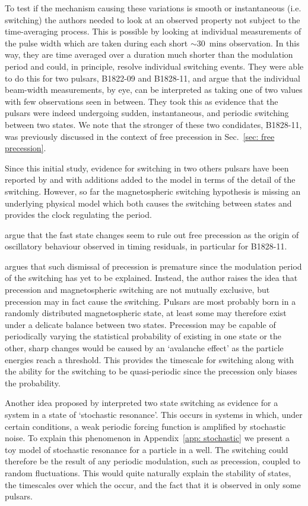 To test if the mechanism causing these variations is smooth or instantaneous
(i.e. switching) the authors needed to look at an observed property not subject
to the time-averaging process.  This is possible by looking at individual
measurements of the pulse width which are taken during each short $\sim30$~mins
observation. In this way, they are time averaged over a duration much shorter
than the modulation period and could, in principle, resolve individual
switching events. They were able to do this for two pulsars, B1822-09 and
B1828-11, and argue that the individual beam-width measurements, by eye, can be
interpreted as taking one of two values with few observations seen in between.
They took this as evidence that the pulsars were indeed undergoing sudden,
instantaneous, and periodic switching between two states. We note that the
stronger of these two condidates, B1828-11, was previously discussed in the
context of free precession in Sec.~\ref{sec: free precession}.

Since this initial study, evidence for switching in two others pulsars have
been reported by \citet{Perera2014} and \citet{Perera2016} with additions added
to the model in terms of the detail of the switching. However, so far the
magnetospheric switching hypothesis is missing an underlying physical model
which both causes the switching between states and provides the clock regulating
the period.

\citet{Lyne2010} argue that the fast state changes seem to rule out free
precession as the origin of oscillatory behaviour observed in timing residuals,
in particular for B1828-11.

\citet{Jones2012} argues that such dismissal of precession is premature since
the modulation period of the switching has yet to be explained.  Instead, the
author raises the idea that precession and magnetospheric switching are not
mutually exclusive, but precession may in fact cause the switching. Pulsars are
most probably born in a randomly distributed magnetospheric state, at least
some may therefore exist under a delicate balance between two states.
Precession may be capable of periodically varying the statistical probability
of existing in one state or the other, sharp changes would be caused by an
`avalanche effect' as the particle energies reach a threshold.  This provides
the timescale for switching along with the ability for the switching to be
quasi-periodic since the precession only biases the probability.

Another idea proposed by \citet{Cordes2013} interpreted two state
switching as evidence for a system in a state of `stochastic resonance'.  This
occurs in systems in which, under certain conditions, a weak periodic forcing
function is amplified by stochastic noise. To explain this phenomenon in
Appendix~\ref{app: stochastic} we present a toy model of stochastic resonance
for a particle in a well. The switching could therefore be the result of any
periodic modulation, such as precession, coupled to random fluctuations. This
would quite naturally explain the stability of states, the timescales over
which the occur, and the fact that it is observed in only some pulsars.


